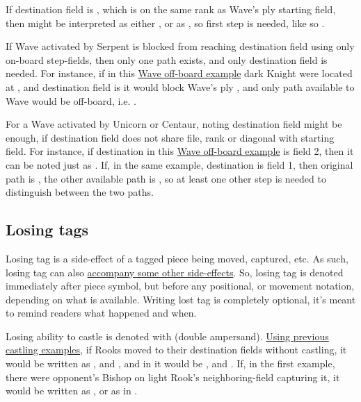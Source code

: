 If destination field is , which is on the same rank as Wave's ply starting field,
then  might be interpreted as either , or as \newline
{}, so first step is needed, like so .

If Wave activated by Serpent is blocked from reaching destination field using only on-board
step-fields, then only one path exists, and only destination field is needed. For instance,
if in this
\hyperref[fig:scn_tr_33_wave_out_of_board]{Wave off-board example} dark Knight were located at
, and destination field is  it would block Wave's ply ,
and only path available to Wave would be off-board, i.e. .

For a Wave activated by Unicorn or Centaur, noting destination field might be enough, if
destination field does not share file, rank or diagonal with starting field. For instance, if
destination in this \hyperref[fig:scn_mv_25_wave_off_board]{Wave off-board example} is field 2,
then it can be noted just as . If, in the same example, destination is field 1,
then original path is , the other available path is
, so at least one other step is needed to distinguish between the
two paths.

\subsection*{Losing tags}
\label{sec:Appendix/Notation/Losing tags}

Losing tag is a side-effect of a tagged piece being moved, captured, etc. As such, losing tag can
also \hyperref[tbl:Appendix/Summary/Accompanying-losing-tags]{accompany some other side-effects}.
So, losing tag is denoted immediately after piece symbol, but before any positional, or movement
notation, depending on what is available. Writing lost tag is completely optional, it's meant to
remind readers what happened and when.

Losing ability to castle is denoted with \alg{\&\&} (double ampersand).
\hyperref[sec:Appendix/Notation/Castling]{Using previous castling examples}, if Rooks
moved to their destination fields without castling, it would be written as ,
and , and in  it would be , and .
If, in the first example, there were opponent's Bishop on light Rook's neighboring-field
capturing it, it would be written as , or as  in
.

